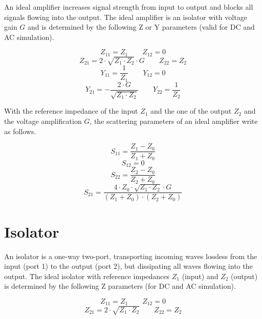An ideal amplifier increases signal strength from input to output and
blocks all signals flowing into the output.  
The ideal amplifier is an isolator with voltage gain $G$ and is
determined by the following Z or Y parameters (valid for DC and
AC simulation).

\begin{equation}
Z_{11} = Z_1  \qquad
Z_{12} = 0
\end{equation}
\begin{equation}
Z_{21} = 2\cdot\sqrt{Z_1\cdot Z_2}\cdot G  \qquad
Z_{22} = Z_2
\end{equation}
\begin{equation}
Y_{11} = \frac{1}{Z_1}  \qquad
Y_{12} = 0
\end{equation}
\begin{equation}
Y_{21} = -\frac{2\cdot G}{\sqrt{Z_1\cdot Z_2}}  \qquad
Y_{22} = \frac{1}{Z_2}
\end{equation}

With the reference
impedance of the input $Z_1$ and the one of the output $Z_2$ and the
voltage amplification $G$, the scattering parameters of an ideal
amplifier write as follows.

\begin{equation}
S_{11} = \frac{Z_1-Z_0}{Z_1+Z_0}
\end{equation}
\begin{equation}
S_{12} = 0
\end{equation}
\begin{equation}
S_{22} = \frac{Z_2-Z_0}{Z_2+Z_0}
\end{equation}
\begin{equation}
S_{21} = \frac{4\cdot Z_0\cdot\sqrt{Z_1\cdot Z_2}\cdot G}{(Z_1+Z_0)\cdot(Z_2+Z_0)}
\end{equation}


\section{Isolator}

An isolator is a one-way two-port, transporting incoming waves
lossless from the input (port 1) to the output (port 2), but dissipating
all waves flowing into the output.
The ideal isolator with reference impedances $Z_1$ (input) and $Z_2$
(output) is determined by the following Z parameters (for DC and
AC simulation).

\begin{equation}
Z_{11} = Z_1  \qquad
Z_{12} = 0
\end{equation}
\begin{equation}
Z_{21} = 2\cdot\sqrt{Z_1\cdot Z_2}  \qquad
Z_{22} = Z_2
\end{equation}

